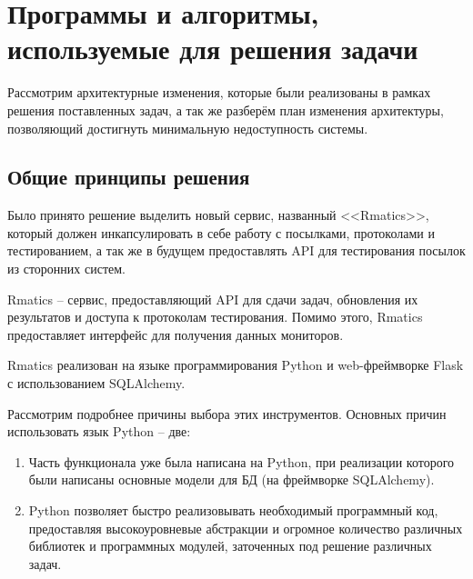 \chapter{Программы и алгоритмы, используемые для решения задачи}

Рассмотрим архитектурные изменения, которые были реализованы в рамках решения поставленных задач, 
а так же разберём план изменения архитектуры, позволяющий достигнуть минимальную недоступность системы.

\section{Общие принципы решения}

Было принято решение выделить новый сервис, названный <<Rmatics>>, который должен инкапсулировать в себе работу с посылками, протоколами и тестированием, 
а так же в будущем предоставлять API для тестирования посылок из сторонних систем.

Rmatics -- сервис, предоставляющий API для сдачи задач, обновления их результатов и доступа к протоколам тестирования. 
Помимо этого, Rmatics предоставляет интерфейс для получения данных мониторов.

Rmatics реализован на языке программирования Python и web-фреймворке Flask с использованием SQLAlchemy.


Рассмотрим подробнее причины выбора этих инструментов. Основных причин использовать язык Python -- две:

\begin{enumerate}
    \item Часть функционала уже была написана на Python, при реализации которого были написаны основные модели для БД (на фреймворке SQLAlchemy).
    \item Python позволяет быстро реализовывать необходимый программный код, 
предоставляя высокоуровневые абстракции и огромное количество различных библиотек и программных модулей, заточенных под решение различных задач.
\end{enumerate}
